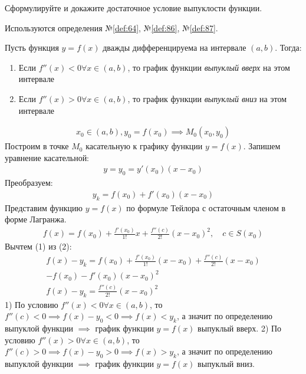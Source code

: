 \begin{question}
    Сформулируйте и докажите достаточное условие выпуклости функции.
\end{question}
\begin{used}
    Используются определения №\ref{def:64}, №\ref{def:86}, №\ref{def:87}.
\end{used}
\begin{theorem}
    Пусть функция $y = f(x)$ дважды дифференцируема на интервале  $(a, b)$. 
    Тогда: 
    \begin{enumerate}
        \item Если  $f''(x) < 0 \forall  x \in (a, b)$, то график функции \textit{выпуклый вверх} на этом интервале
        \item Если  $f''(x) > 0 \forall  x \in (a, b)$, то график функции \textit{выпуклый вниз} на этом интервале
    \end{enumerate}
\end{theorem}
\begin{sufficiency}
    \begin{gather*}
        x_0 \in (a, b), y_0 = f(x_0) \implies M_0(x_0, y_0)
    \end{gather*}
    Построим в точке $M_0$ касательную к графику функции $y = f(x)$. Запишем уравнение касательной:
    \begin{gather*}
        y = y_0 = y'(x_0)(x - x_0) 
    \end{gather*}
    Преобразуем:
    \begin{gather*}
        y_k = f(x_0) + f'(x_0)(x - x_0) \tag{0} 
    \end{gather*}
    Представим функцию $y=f(x)$ по формуле Тейлора с остаточным членом в форме Лагранжа.
    \begin{gather*}
        f(x) = f(x_0) + \frac{f'(x_0)}{1!}x + \frac{f''(c)}{2!}(x - x_0)^2, \quad c \in S(x_0) \tag{2} 
    \end{gather*}
    Вычтем (1) из (2):
    \begin{gather*}
        f(x) - y_k = f(x_0) + \frac{f'(x_{0})}{1!}(x - x_0) + \frac{f''(c)}{2!}(x - x_0)\\
             - f(x_0) - f'(x_0)(x - x_0)^2 \\
        f(x) - y_k = \frac{f''(c)}{2!}(x - x_0)^2
    \end{gather*}
    1) По условию $f''(x) < 0 \forall x \in (a, b)$, то $f''(c) < 0 \implies f(x) - y_0 < 0 \implies f(x) < y_k$, а значит по определению выпуклой функции $\implies$ график функции $y = f(x)$ выпуклый вверх.
    2) По условию $f''(x) > 0 \forall x \in (a, b)$, то $f''(c) > 0 \implies f(x) - y_0 > 0 \implies f(x) > y_k$, а значит по определению выпуклой функции $\implies$ график функции $y = f(x)$ выпуклый вниз.
\end{sufficiency}
\pagebreak



